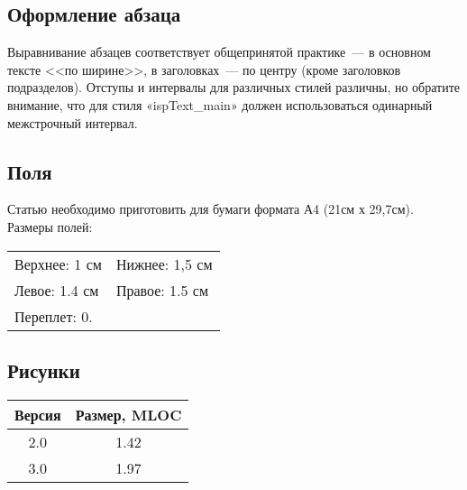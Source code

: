 \documentclass{ProcISPRAS}
\begin{document}
\subsection{Оформление абзаца}

Выравнивание абзацев соответствует общепринятой практике~--- в основном тексте
<<по ширине>>, в заголовках~--- по центру (кроме заголовков подразделов).
Отступы и интервалы для различных стилей различны, но обратите внимание, что для
стиля «ispText\_main» должен использоваться одинарный межстрочный интервал.

\subsection{Поля}

Статью необходимо приготовить для бумаги формата А4 (21см х 29,7см). Размеры
полей:

\begin{tabular}{ll}
  Верхнее: 1 см & Нижнее: 1,5 см \\
  Левое: 1.4 см & Правое: 1.5 см \\
  Переплет: 0.  & \\
\end{tabular}

\subsection{Рисунки}

\begin{figure}[t]
  \centering
  \label{fig:my_label}
\end{figure}

\begin{table}[t]
  \begin{tabular}{cc}
  \toprule
  \textbf{Версия} & \textbf{Размер, MLOC} \\
  \midrule
  2.0             & 1.42 \\
  3.0             & 1.97 \\
  \bottomrule
  \end{tabular}
  \label{tbl:my_label}
\end{table}
\end{document}
